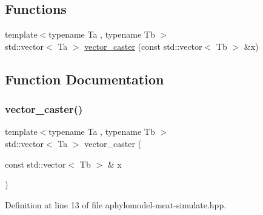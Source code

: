\subsection*{Functions}
\begin{DoxyCompactItemize}
\item 
{\footnotesize template$<$typename Ta , typename Tb $>$ }\\std\+::vector$<$ Ta $>$ \hyperlink{aphylomodel-meat-simulate_8hpp_a13c91ee42db6c3b986acbbac4ee58cb0}{vector\+\_\+caster} (const std\+::vector$<$ Tb $>$ \&x)
\end{DoxyCompactItemize}


\subsection{Function Documentation}
\mbox{\label{aphylomodel-meat-simulate_8hpp_a13c91ee42db6c3b986acbbac4ee58cb0}} 
\subsubsection{\texorpdfstring{vector\+\_\+caster()}{vector\_caster()}}
{\footnotesize\ttfamily template$<$typename Ta , typename Tb $>$ \\
std\+::vector$<$ Ta $>$ vector\+\_\+caster (\begin{DoxyParamCaption}\item[{const std\+::vector$<$ Tb $>$ \&}]{x }\end{DoxyParamCaption})\hspace{0.3cm}{\ttfamily [inline]}}



Definition at line 13 of file aphylomodel-\/meat-\/simulate.\+hpp.

